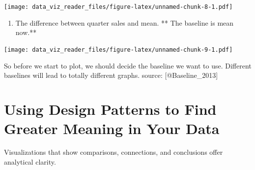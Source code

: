 \documentclass[]{book}
\newenvironment{Shaded}{\begin{snugshade}}{\end{snugshade}}
\newcommand{\KeywordTok}[1]{\textcolor[rgb]{0.13,0.29,0.53}{\textbf{#1}}}
\newcommand{\DataTypeTok}[1]{\textcolor[rgb]{0.13,0.29,0.53}{#1}}
\newcommand{\DecValTok}[1]{\textcolor[rgb]{0.00,0.00,0.81}{#1}}
\newcommand{\StringTok}[1]{\textcolor[rgb]{0.31,0.60,0.02}{#1}}
\newcommand{\CommentTok}[1]{\textcolor[rgb]{0.56,0.35,0.01}{\textit{#1}}}
\newcommand{\OtherTok}[1]{\textcolor[rgb]{0.56,0.35,0.01}{#1}}
\newcommand{\ControlFlowTok}[1]{\textcolor[rgb]{0.13,0.29,0.53}{\textbf{#1}}}
\newcommand{\OperatorTok}[1]{\textcolor[rgb]{0.81,0.36,0.00}{\textbf{#1}}}
\newcommand{\NormalTok}[1]{#1}
\providecommand{\tightlist}{%
  \setlength{\itemsep}{0pt}\setlength{\parskip}{0pt}}
\theoremstyle{definition}
\theoremstyle{definition}
\theoremstyle{definition}
\theoremstyle{remark}
\begin{document}
\texttt{[image: data\_viz\_reader\_files/figure-latex/unnamed-chunk-8-1.pdf]}

\begin{enumerate}
\def\labelenumi{\arabic{enumi}.}
\setcounter{enumi}{4}
\tightlist
\item
  The difference between quarter sales and mean. ** The baseline is mean
  now.**
\end{enumerate}

\begin{Shaded}
\end{Shaded}

\texttt{[image: data\_viz\_reader\_files/figure-latex/unnamed-chunk-9-1.pdf]}

So before we start to plot, we should decide the baseline we want to
use. Different baselines will lead to totally different graphs. source:
{[}@Baseline\_2013{]}

\section{Using Design Patterns to Find Greater Meaning in Your
Data}\label{using-design-patterns-to-find-greater-meaning-in-your-data}

Visualizations that show comparisons, connections, and conclusions offer
analytical clarity.
\end{document}
